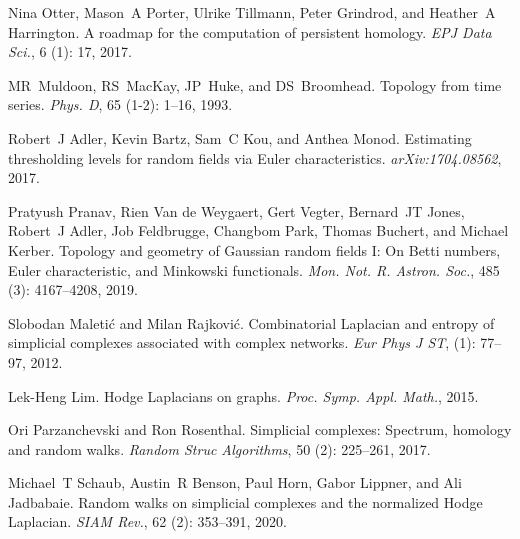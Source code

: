 Nina Otter, Mason~A Porter, Ulrike Tillmann, Peter Grindrod, and Heather~A
Harrington.
\newblock A roadmap for the computation of persistent homology.
\newblock \emph{EPJ Data Sci.}, 6 (1): 17, 2017.

MR~Muldoon, RS~MacKay, JP~Huke, and DS~Broomhead.
\newblock Topology from time series.
\newblock \emph{Phys. D}, 65 (1-2): 1--16, 1993.

Robert~J Adler, Kevin Bartz, Sam~C Kou, and Anthea Monod.
\newblock Estimating thresholding levels for random fields via {{Euler}}
characteristics.
\newblock \emph{arXiv:1704.08562}, 2017.

Pratyush Pranav, Rien {Van de Weygaert}, Gert Vegter, Bernard~JT Jones,
Robert~J Adler, Job Feldbrugge, Changbom Park, Thomas Buchert, and Michael
Kerber.
\newblock Topology and geometry of {{Gaussian}} random fields {{I}}: On
{{Betti}} numbers, {{Euler}} characteristic, and {{Minkowski}} functionals.
\newblock \emph{Mon. Not. R. Astron. Soc.}, 485 (3):
4167--4208, 2019.

Slobodan Maleti{\'c} and Milan Rajkovi{\'c}.
\newblock Combinatorial {{Laplacian}} and entropy of simplicial complexes
associated with complex networks.
\newblock \emph{Eur Phys J ST},  (1): 77--97, 2012.

Lek-Heng Lim.
\newblock Hodge {Laplacians} on graphs.
\newblock \emph{Proc. Symp. Appl. Math.}, 2015.

Ori Parzanchevski and Ron Rosenthal.
\newblock Simplicial complexes: Spectrum, homology and random walks.
\newblock \emph{Random Struc Algorithms}, 50 (2): 225--261,
2017.

Michael~T Schaub, Austin~R Benson, Paul Horn, Gabor Lippner, and Ali Jadbabaie.
\newblock Random walks on simplicial complexes and the normalized {Hodge}
{Laplacian}.
\newblock \emph{SIAM Rev.}, 62 (2): 353--391, 2020.

